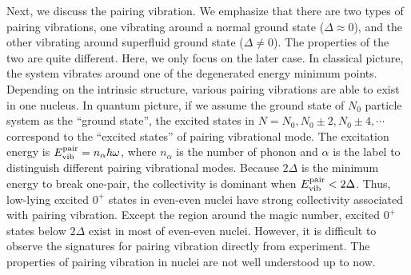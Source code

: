 \documentclass[11pt]{book} %
\begin{document}
Next, we discuss the pairing vibration. We emphasize that there are two types of pairing vibrations, one vibrating around a normal ground state ($\Delta\approx 0$), and the other vibrating around superfluid ground state ($\Delta\neq 0$). The properties of the two are quite different. 
Here, we only focus on the later case.
In classical picture, the system vibrates around one of the degenerated energy minimum points. Depending on the intrinsic structure, various pairing vibrations are able to exist in one nucleus. 
In quantum picture, if we assume the ground state of $N_0$ particle system as the ``ground state'', the excited states in $N=N_0, N_0\pm2, N_0\pm4,\cdots$ correspond to the ``excited states'' of pairing vibrational mode. The excitation energy is $E_{\rm vib}^{\rm pair}=n_{\alpha}\hbar\omega$, where $n_{\alpha}$ is the number of phonon and $\alpha$ is the label to distinguish different pairing vibrational modes. Because $2\Delta$ is the minimum energy to break one-pair, the collectivity is dominant when $E_{\rm vib}^{\rm pair}<2\Delta$. Thus, low-lying excited $0^+$ states in even-even nuclei have strong collectivity associated with pairing vibration. Except the region around the magic number, excited $0^+$ states below $2\Delta$ exist in most of even-even nuclei. However, it is difficult to observe the signatures for pairing vibration directly from experiment. The properties of pairing vibration in nuclei are not well understood up to now.
\end{document}
